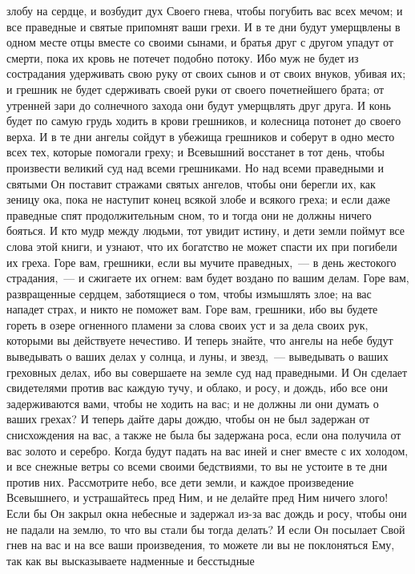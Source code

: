 злобу на сердце, и возбудит дух Своего гнева, чтобы погубить вас всех мечом; и
все праведные и святые припомнят ваши грехи.
И в те дни будут умерщвлены в одном месте отцы вместе со своими
сынами, и братья друг с другом упадут от смерти, пока их кровь не потечет
подобно потоку.
Ибо муж не будет из сострадания удерживать свою руку от своих сынов и
от своих внуков, убивая их; и грешник не будет сдерживать своей руки от своего
почетнейшего брата; от утренней зари до солнечного захода они будут умерщвлять
друг друга.
И конь будет по самую грудь ходить в крови грешников, и колесница
потонет до своего верха.
И в те дни ангелы сойдут в убежища грешников и соберут в одно место
всех тех, которые помогали греху; и Всевышний восстанет в тот день, чтобы
произвести великий суд над всеми грешниками.
Но над всеми праведными и святыми Он поставит стражами святых ангелов,
чтобы они берегли их, как зеницу ока, пока не наступит конец всякой злобе и
всякого греха; и если даже праведные спят продолжительным сном, то и тогда они
не должны ничего бояться.
И кто мудр между людьми, тот увидит истину, и дети земли поймут все
слова этой книги, и узнают, что их богатство не может спасти их при погибели их
греха.
Горе вам, грешники, если вы мучите праведных,~--- в день жестокого
страдания,~--- и сжигаете их огнем: вам будет воздано по вашим делам.
Горе вам, развращенные сердцем, заботящиеся о том, чтобы измышлять
злое; на вас нападет страх, и никто не поможет вам.
Горе вам, грешники, ибо вы будете гореть в озере огненного пламени за
слова своих уст и за дела своих рук, которыми вы действуете нечестиво.
И теперь знайте, что ангелы на небе будут выведывать о ваших делах у
солнца, и луны, и звезд,~--- выведывать о ваших греховных делах, ибо вы
совершаете на земле суд над праведными.
И Он сделает свидетелями против вас каждую тучу, и облако, и росу, и
дождь, ибо все они задерживаются вами, чтобы не ходить на вас; и не должны ли
они думать о ваших грехах?
И теперь дайте дары дождю, чтобы он не был задержан от снисхождения
на вас, а также не была бы задержана роса, если она получила от вас золото и
серебро.
Когда будут падать на вас иней и снег вместе с их холодом, и все
снежные ветры со всеми своими бедствиями, то вы не устоите в те дни против них.
Рассмотрите небо, все дети земли, и каждое произведение
Всевышнего, и устрашайтесь пред Ним, и не делайте пред Ним ничего злого!
Если бы Он закрыл окна небесные и задержал из-за вас дождь и росу,
чтобы они не падали на землю, то что вы стали бы тогда делать?
И если Он посылает Свой гнев на вас и на все ваши произведения, то
можете ли вы не поклоняться Ему, так как вы высказываете надменные и бесстыдные
